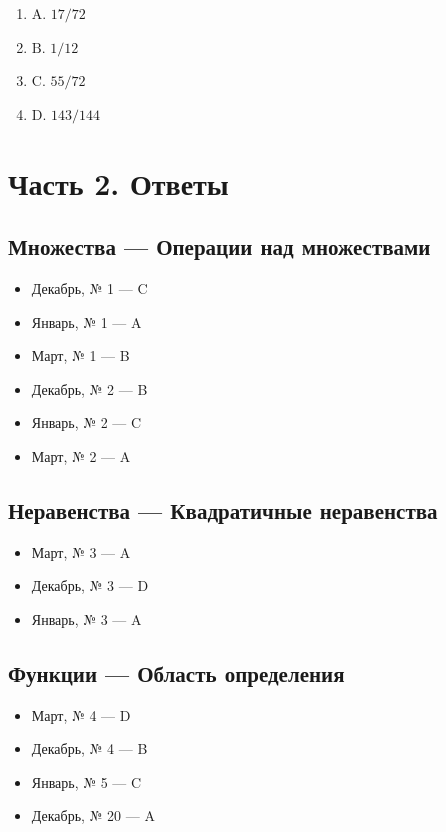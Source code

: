 \begin{enumerate}
\begin{enumerate}
\item $\displaystyle \text{A. 17/72}$
\item $\displaystyle \text{B. 1/12}$
\item $\displaystyle \text{C. 55/72}$
\item $\displaystyle \text{D. 143/144}$
\end{enumerate}
\end{enumerate}

\clearpage
\section*{Часть 2. Ответы}

\subsection*{Множества — Операции над множествами}
\begin{itemize}
\item Декабрь, № 1 — C
\item Январь, № 1 — A
\item Март, № 1 — B
\item Декабрь, № 2 — B
\item Январь, № 2 — C
\item Март, № 2 — A
\end{itemize}

\subsection*{Неравенства — Квадратичные неравенства}
\begin{itemize}
\item Март, № 3 — A
\item Декабрь, № 3 — D
\item Январь, № 3 — A
\end{itemize}

\subsection*{Функции — Область определения}
\begin{itemize}
\item Март, № 4 — D
\item Декабрь, № 4 — B
\item Январь, № 5 — C
\item Декабрь, № 20 — A
\end{itemize}

